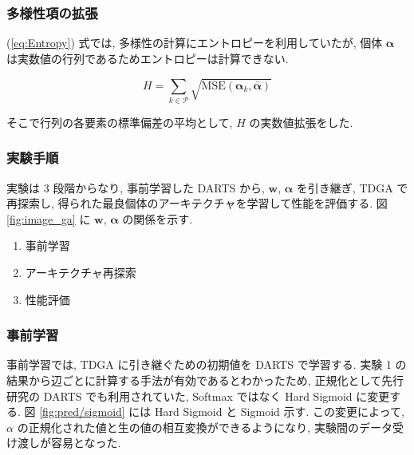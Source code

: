 \subsubsection{多様性項の拡張}
(\ref{eq:Entropy}) 式では, 多様性の計算にエントロピーを利用していたが,
個体 $\bm{\alpha}$ は実数値の行列であるためエントロピーは計算できない.

\begin{equation}
H = \sum_{k \in \mathcal{P}} \sqrt{\mathrm{MSE}(\bm{\alpha}_k, \bar{\bm{\alpha}})} \label{eq:Entropy-new}
\end{equation}

そこで行列の各要素の標準偏差の平均として, $H$ の実数値拡張をした.


\subsubsection{実験手順}
実験は 3 段階からなり, 事前学習した DARTS から, $\bm{w}$, $\bm{\alpha}$ を引き継ぎ,
TDGA で再探索し, 得られた最良個体のアーキテクチャを学習して性能を評価する.
図 \ref{fig:image_ga} に $\bm{w}$, $\bm{\alpha}$ の関係を示す.

\begin{enumerate}
  \item 事前学習
  \item アーキテクチャ再探索
  \item 性能評価
\end{enumerate}

\subsubsection{事前学習}

事前学習では, TDGA に引き継ぐための初期値を DARTS で学習する.
実験 1 の結果から辺ごとに計算する手法が有効であるとわかったため,
正規化として先行研究の DARTS でも利用されていた,
Softmax ではなく Hard Sigmoid に変更する.
図 \ref{fig:pred/sigmoid} には Hard Sigmoid と Sigmoid 示す.
この変更によって, $\alpha$ の正規化された値と生の値の相互変換ができるようになり,
実験間のデータ受け渡しが容易となった.


